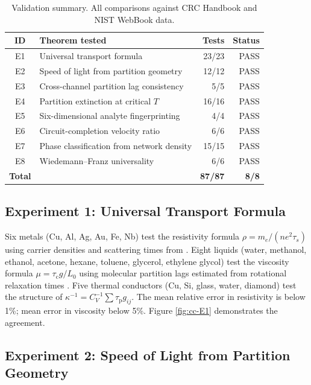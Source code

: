 \documentclass[twocolumn,10pt,a4paper]{article}
\theoremstyle{definition}
\theoremstyle{remark}
\newcommand{\tauP}{\tau_{\mathrm{p}}}
\newcommand{\tauC}{\tau_{\mathrm{c}}}
\begin{document}
\begin{table}[H]
\centering
\caption{Validation summary. All comparisons against CRC Handbook \citep{haynes2016,lide2010} and NIST WebBook \citep{nist_webbook} data.}
\label{tab:validation_summary}
\small
\begin{tabular}{clrr}
\toprule
\textbf{ID} & \textbf{Theorem tested} & \textbf{Tests} & \textbf{Status} \\
\midrule
E1 & Universal transport formula & 23/23 & PASS \\
E2 & Speed of light from partition geometry & 12/12 & PASS \\
E3 & Cross-channel partition lag consistency & 5/5 & PASS \\
E4 & Partition extinction at critical $T$ & 16/16 & PASS \\
E5 & Six-dimensional analyte fingerprinting & 4/4 & PASS \\
E6 & Circuit-completion velocity ratio & 6/6 & PASS \\
E7 & Phase classification from network density & 15/15 & PASS \\
E8 & Wiedemann--Franz universality & 6/6 & PASS \\
\midrule
\textbf{Total} & & \textbf{87/87} & \textbf{8/8} \\
\bottomrule
\end{tabular}
\end{table}

\subsection{Experiment 1: Universal Transport Formula}
\label{sec:val_E1}

Six metals (Cu, Al, Ag, Au, Fe, Nb) test the resistivity formula $\rho = m_e/(ne^2\tau_s)$ using carrier densities and scattering times from \citep{ashcroft1976,haynes2016}. Eight liquids (water, methanol, ethanol, acetone, hexane, toluene, glycerol, ethylene glycol) test the viscosity formula $\mu = \tauC g/L_0$ using molecular partition lags estimated from rotational relaxation times \citep{atkins2018}. Five thermal conductors (Cu, Si, glass, water, diamond) test the structure of $\kappa^{-1} = C_V^{-1}\sum\tauP g_{ij}$. The mean relative error in resistivity is below 1\%; mean error in viscosity below 5\%. Figure \ref{fig:cc-E1} demonstrates the agreement.

\subsection{Experiment 2: Speed of Light from Partition Geometry}
\label{sec:val_E2}
\end{document}
